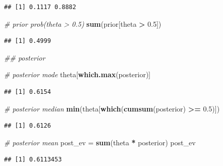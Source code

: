 \documentclass[
]{book}
\newenvironment{Shaded}{\begin{snugshade}}{\end{snugshade}}
\newcommand{\CommentTok}[1]{\textcolor[rgb]{0.56,0.35,0.01}{\textit{#1}}}
\newcommand{\FloatTok}[1]{\textcolor[rgb]{0.00,0.00,0.81}{#1}}
\newcommand{\KeywordTok}[1]{\textcolor[rgb]{0.13,0.29,0.53}{\textbf{#1}}}
\newcommand{\NormalTok}[1]{#1}
\newcommand{\OperatorTok}[1]{\textcolor[rgb]{0.81,0.36,0.00}{\textbf{#1}}}
\newcommand{\StringTok}[1]{\textcolor[rgb]{0.31,0.60,0.02}{#1}}
\theoremstyle{definition}
\theoremstyle{definition}
\theoremstyle{definition}
\theoremstyle{remark}
\begin{document}
\begin{verbatim}
## [1] 0.1117 0.8882
\end{verbatim}

\begin{Shaded}
\begin{Highlighting}[]
\CommentTok{\# prior prob(theta \textgreater{} 0.5)}
\KeywordTok{sum}\NormalTok{(prior[theta }\OperatorTok{\textgreater{}}\StringTok{ }\FloatTok{0.5}\NormalTok{])}
\end{Highlighting}
\end{Shaded}

\begin{verbatim}
## [1] 0.4999
\end{verbatim}

\begin{Shaded}
\begin{Highlighting}[]
\CommentTok{\#\# posterior}

\CommentTok{\# posterior mode}
\NormalTok{theta[}\KeywordTok{which.max}\NormalTok{(posterior)]}
\end{Highlighting}
\end{Shaded}

\begin{verbatim}
## [1] 0.6154
\end{verbatim}

\begin{Shaded}
\begin{Highlighting}[]
\CommentTok{\# posterior median}
\KeywordTok{min}\NormalTok{(theta[}\KeywordTok{which}\NormalTok{(}\KeywordTok{cumsum}\NormalTok{(posterior) }\OperatorTok{\textgreater{}=}\StringTok{ }\FloatTok{0.5}\NormalTok{)])}
\end{Highlighting}
\end{Shaded}

\begin{verbatim}
## [1] 0.6126
\end{verbatim}

\begin{Shaded}
\begin{Highlighting}[]
\CommentTok{\# posterior mean}
\NormalTok{post\_ev =}\StringTok{ }\KeywordTok{sum}\NormalTok{(theta }\OperatorTok{*}\StringTok{ }\NormalTok{posterior)}
\NormalTok{post\_ev}
\end{Highlighting}
\end{Shaded}

\begin{verbatim}
## [1] 0.6113453
\end{verbatim}
\end{document}
